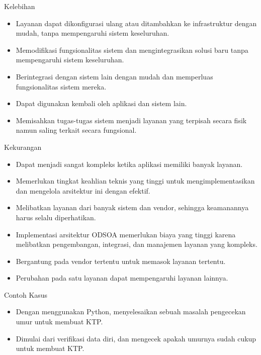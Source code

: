 \documentclass[aspectratio=169, table]{beamer}
\begin{document}
	\begin{frame}{Kelebihan}

		\begin{itemize}
			\item Layanan dapat dikonfigurasi ulang atau ditambahkan ke infrastruktur dengan mudah, tanpa mempengaruhi sistem keseluruhan.
			\item Memodifikasi fungsionalitas sistem dan mengintegrasikan solusi baru tanpa mempengaruhi sistem keseluruhan.
			\item Berintegrasi dengan sistem lain dengan mudah dan memperluas fungsionalitas sistem mereka.
			\item Dapat digunakan kembali oleh aplikasi dan sistem lain.
			\item Memisahkan tugas-tugas sistem menjadi layanan yang terpisah secara fisik namun saling terkait secara fungsional.

		\end{itemize}
	\end{frame}

	\begin{frame}{Kekurangan}

		\begin{itemize}
			\item Dapat menjadi sangat kompleks ketika aplikasi memiliki banyak layanan.
			\item Memerlukan tingkat keahlian teknis yang tinggi untuk mengimplementasikan dan mengelola arsitektur ini dengan efektif.
			\item Melibatkan layanan dari banyak sistem dan vendor, sehingga keamanannya harus selalu diperhatikan.
			\item Implementasi arsitektur ODSOA memerlukan biaya yang tinggi karena melibatkan pengembangan, integrasi, dan manajemen layanan yang kompleks.
			\item Bergantung pada vendor tertentu untuk memasok layanan tertentu.
			\item Perubahan pada satu layanan dapat mempengaruhi layanan lainnya.
		\end{itemize}
	\end{frame}

	\begin{frame}{Contoh Kasus}
		\begin{itemize}
			\item Dengan menggunakan Python, menyelesaikan sebuah masalah pengecekan umur untuk membuat KTP.
			\item Dimulai dari verifikasi data diri, dan mengecek apakah umurnya sudah cukup untuk membuat KTP.
		\end{itemize}
	\end{frame}
\end{document}
